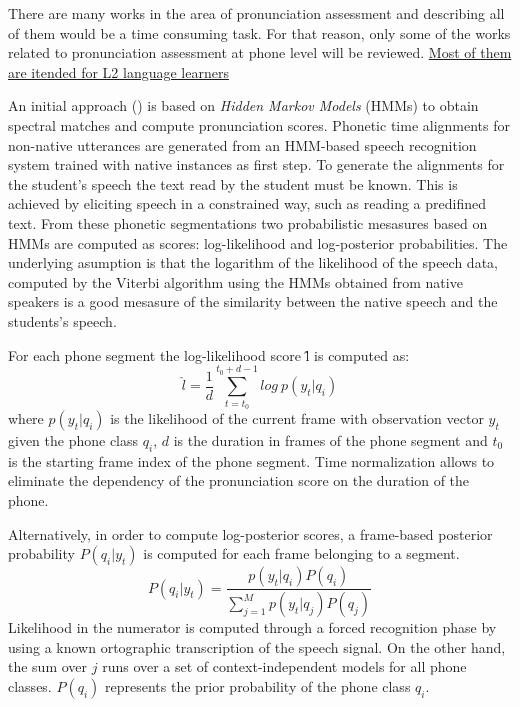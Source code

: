There are many works in the area of pronunciation assessment and describing all of them would
be a time consuming task. For that reason, only some of the works related to 
pronunciation assessment at phone level will be reviewed. \underline{Most of them are itended
for L2 language learners}

An initial approach
(\cite{pronunciation_scoring_instruction}\cite{pronunciation_scoring_phone_segments_instruction}) 
is based on \textit{Hidden Markov Models} (HMMs) to obtain 
spectral matches and compute pronunciation scores. Phonetic time alignments for
non-native utterances are generated from an HMM-based speech recognition system trained
with native instances as first step. To generate the alignments for the student's
speech the text read by the student must be known. This is achieved by eliciting speech in a
constrained way, such as reading a predifined text.
From these phonetic segmentations two 
probabilistic mesasures based on HMMs are computed as scores: log-likelihood and 
log-posterior probabilities. The underlying asumption is that the logarithm of the likelihood
of the speech data, computed by the Viterbi algorithm using the HMMs obtained from native
speakers is a good mesasure of the similarity between the native speech and the students's
speech.

For each phone segment the log-likelihood score \^{l} is computed as:
\begin{equation}
\hat{l} = \frac{1}{d} \sum_{t=t_{0}}^{t_{0}+d-1} log \ p(y_{t}|q_{i})
\end{equation}
where $p(y_{t}|q_{i})$ is the likelihood of the current frame with observation vector $y_{t}$
given the phone class $q_{i}$, $d$ is the duration in frames of the phone segment 
and $t_{0}$ is the starting frame index of the phone segment. Time normalization allows to 
eliminate the dependency of the pronunciation score on the duration of the phone.

Alternatively, in order to compute log-posterior scores, a frame-based posterior probability
$P(q_{i}|y_{t})$ is computed for each frame belonging to a segment.
\begin{equation}
P(q_{i}|y_{t}) = \frac{p(y_{t}|q_{i})P(q_{i})}{\sum\limits_{j=1}^{M} p(y_{t}|q_{j})P(q_{j})}
\end{equation}
Likelihood in the numerator is computed through a forced recognition phase by using a known 
ortographic transcription of the speech signal. On the other hand, 
the sum over $j$ runs over a set of context-independent models for all phone classes. $P(q_{i})$
represents the prior probability of the phone class $q_{i}$. 

